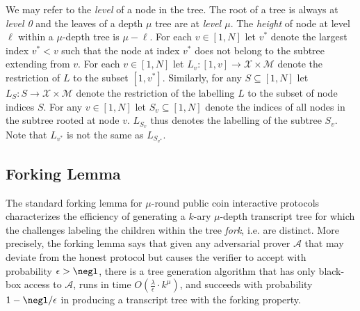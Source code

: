 We may refer to the \emph{level} of a node in the tree. The root of a tree is always at \emph{level 0} and the leaves of a depth $\mu$ tree are at \emph{level $\mu$}. The \emph{height} of node at level $\ell$ within a $\mu$-depth tree is $\mu - \ell$. For each $v \in [1,N]$ let $v^*$ denote the largest index $v^* < v$ such that the node at index $v^*$ does not belong to the subtree extending from $v$. For each $v \in [1,N]$ let $L_v:[1,v] \rightarrow \mathcal{X} \times \mathcal{M}$ denote the restriction of $L$ to the subset $[1,v^*]$. 
Similarly, for any $S \subseteq [1,N]$ let $L_S: S \rightarrow \mathcal{X} \times \mathcal{M}$ denote the restriction of the labelling $L$ to the subset of node indices $S$. For any $v \in [1, N]$ let $S_v \subseteq [1,N]$ denote the indices of all nodes in the subtree rooted at node $v$. $L_{S_v}$ thus denotes the labelling of the subtree $S_v$. Note that $L_{v^*}$ is not the same as $L_{S_{v^*}}$. 

\subsection{Forking Lemma}
The standard forking lemma for $\mu$-round public coin interactive protocols characterizes the efficiency of generating a $k$-ary $\mu$-depth transcript tree for which the challenges labeling the children within the tree \emph{fork}, i.e. are distinct. More precisely, the forking lemma says that given any adversarial prover $\mathcal{A}$ that may deviate from the honest protocol but causes the verifier to accept with probability $\epsilon > \negl$, there is a tree generation algorithm that has only black-box access to $\mathcal{A}$, runs in time $O(\frac{\lambda}{\epsilon} \cdot k^\mu)$, and succeeds with probability $1 - \negl/\epsilon$ in producing a transcript tree with the forking property. 

